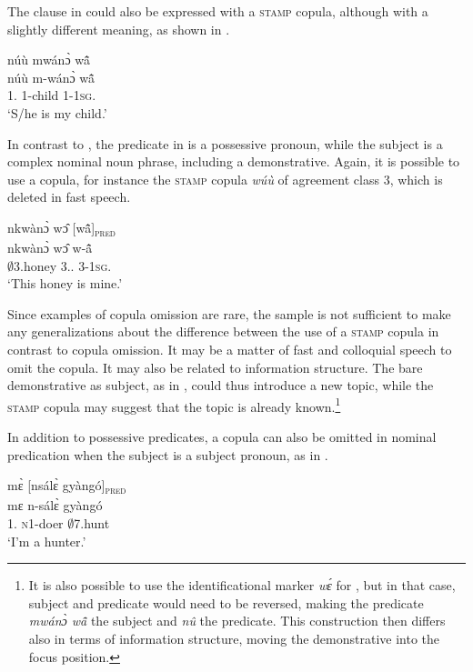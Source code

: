 The clause in  could also be expressed with a \textsc{stamp} copula, although with a slightly different meaning, as shown in . 

\ea \label{we7x}
  \glll núù mwánɔ̀ wã̂\\
núù m-wánɔ̀ wã̂\\
1.{\COP} {\N}1-child 1-1\textsc{sg}.{\POSS}\\
\trans `S/he is my child.'
\z

In contrast to , the predicate in  is a possessive pronoun, while the subject is a complex nominal noun phrase, including a demonstrative. Again, it is possible to use a copula, for instance the \textsc{stamp} copula {\itshape wúù} of agreement class 3, which is deleted in fast speech.

\ea\label{0COP2}
  \glll nkwànɔ̀ wɔ̂ [wã̂]\textsubscript{\textsc{pred}}   \\
        nkwànɔ̀ wɔ̂ {\db}w-ã̂   \\
          $\emptyset$3.honey 3.{\DEM}.{\PROX} {\db}3-1\textsc{sg}.{\POSS}  \\
    \trans `This honey is mine.'
\z

Since examples of copula omission are rare, the sample is not sufficient to make any generalizations about the difference between the use of a \textsc{stamp} copula in contrast to copula omission. It may be a matter of fast and colloquial speech to omit the copula. It may also be related to information structure. The bare demonstrative as subject, as in , could thus introduce a new topic, while the \textsc{stamp} copula may suggest that the topic is already known.\footnote{It is also possible to use the identificational marker {\itshape wɛ́} for , but in that case, subject and predicate would need to be reversed, making the predicate {\itshape mwánɔ̀ wã̂} the subject and {\itshape nû} the predicate. This construction then differs also in terms of information structure, moving the demonstrative into the focus position.}

In addition to possessive predicates, a copula can also be omitted in nominal predication when the subject is a subject pronoun, as in .


\ea\label{0COP3}
  \glll mɛ̀ [nsálɛ̀ gyàngó]\textsubscript{{\textsc{pred}}}   \\
        mɛ {\db}n-sálɛ̀ gyàngó \\
          1.{\SBJ}  {\db}\textsc{n}1-doer $\emptyset$7.hunt\\
    \trans `I'm a hunter.'
\z

